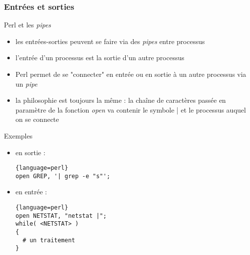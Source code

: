 \begin{frame}[fragile]
  \frametitle{Entrées et sorties}

  \begin{block}{Perl et les \textit{pipes}}
    \begin{itemize}
    \item les entrées-sorties peuvent se faire via des \textit{pipes} entre
      processus
    \item l'entrée d'un processus est la sortie d'un autre processus
    \item Perl permet de se "connecter" en entrée ou en sortie à un autre
      processus via un \textit{pipe}
    \item la philosophie est toujours la même : la chaîne de caractères passée
      en paramètre de la fonction \textit{open} va contenir le symbole | et
      le processus auquel on se connecte
    \end{itemize}
  \end{block}

  \begin{exampleblock}{Exemples}
    \begin{itemize}
    \item en sortie :
      \begin{lstlisting}{language=perl}
open GREP, '| grep -e "s"';
      \end{lstlisting}
    \item en entrée :
      \begin{lstlisting}{language=perl}
open NETSTAT, "netstat |";
while( <NETSTAT> )
{
  # un traitement
}
      \end{lstlisting}
    \end{itemize}
  \end{exampleblock}

\end{frame}

